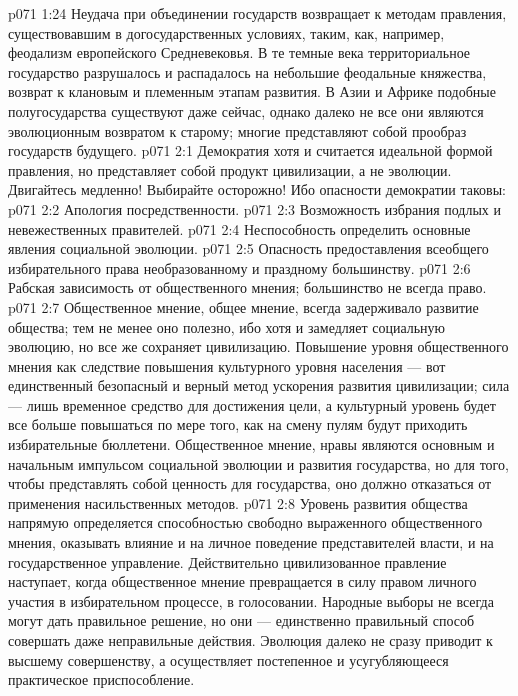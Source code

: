 \vs p071 1:24 Неудача при объединении государств возвращает к методам правления, существовавшим в догосударственных условиях, таким, как, например, феодализм европейского Средневековья. В те темные века территориальное государство разрушалось и распадалось на небольшие феодальные княжества, возврат к клановым и племенным этапам развития. В Азии и Африке подобные полугосударства существуют даже сейчас, однако далеко не все они являются эволюционным возвратом к старому; многие представляют собой прообраз государств будущего.
\vs p071 2:1 Демократия хотя и считается идеальной формой правления, но представляет собой продукт цивилизации, а не эволюции. Двигайтесь медленно! Выбирайте осторожно! Ибо опасности демократии таковы:
\vs p071 2:2 \bibnobreakspace Апология посредственности.
\vs p071 2:3 \bibnobreakspace Возможность избрания подлых и невежественных правителей.
\vs p071 2:4 \bibnobreakspace Неспособность определить основные явления социальной эволюции.
\vs p071 2:5 \bibnobreakspace Опасность предоставления всеобщего избирательного права необразованному и праздному большинству.
\vs p071 2:6 \bibnobreakspace Рабская зависимость от общественного мнения; большинство не всегда право.
\vs p071 2:7 \pc Общественное мнение, общее мнение, всегда задерживало развитие общества; тем не менее оно полезно, ибо хотя и замедляет социальную эволюцию, но все же сохраняет цивилизацию. Повышение уровня общественного мнения как следствие повышения культурного уровня населения --- вот единственный безопасный и верный метод ускорения развития цивилизации; сила --- лишь временное средство для достижения цели, а культурный уровень будет все больше повышаться по мере того, как на смену пулям будут приходить избирательные бюллетени. Общественное мнение, нравы являются основным и начальным импульсом социальной эволюции и развития государства, но для того, чтобы представлять собой ценность для государства, оно должно отказаться от применения насильственных методов.
\vs p071 2:8 Уровень развития общества напрямую определяется способностью свободно выраженного общественного мнения, оказывать влияние и на личное поведение представителей власти, и на государственное управление. Действительно цивилизованное правление наступает, когда общественное мнение превращается в силу правом личного участия в избирательном процессе, в голосовании. Народные выборы не всегда могут дать правильное решение, но они --- единственно правильный способ совершать даже неправильные действия. Эволюция далеко не сразу приводит к высшему совершенству, а осуществляет постепенное и усугубляющееся практическое приспособление.
